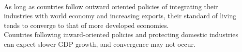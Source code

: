 \begin{remark} \\
As long as countries follow outward oriented policies of integrating their industries with world economy and increasing exports, their standard of living tends to converge to that of more developed economies.\\
Countries following inward-oriented policies and protecting domestic industries can expect slower GDP growth, and convergence may not occur.
\end{remark}